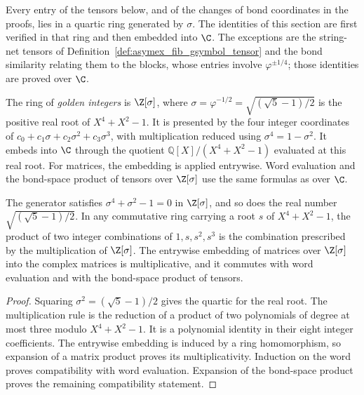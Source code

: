 Every entry of the tensors below, and of the changes of bond
coordinates in the proofs, lies in a quartic ring generated by
$\sigma$. The identities of this section are first verified in that
ring and then embedded into $\C$. The exceptions are the string-net
tensors of Definition~\ref{def:asymex_fib_gsymbol_tensor} and the bond
similarity relating them to the blocks, whose entries involve
$\varphi^{\pm1/4}$; those identities are proved over $\C$.

\begin{definition}
    \label{def:asymex_golden_ring}
    \leanok
    The ring of \emph{golden integers} is $\Z[\sigma]$, where
    $\sigma=\varphi^{-1/2}=\sqrt{(\sqrt5-1)/2}$ is the positive real
    root of $X^4+X^2-1$. It is presented by the four integer
    coordinates of $c_0+c_1\sigma+c_2\sigma^2+c_3\sigma^3$,
    with multiplication reduced using $\sigma^4=1-\sigma^2$.
    It embeds into $\C$ through the quotient
    $\mathbb{Q}[X]/(X^4+X^2-1)$ evaluated at this real root.
    For matrices, the embedding is applied entrywise.
    Word evaluation and the bond-space product of tensors over
    $\Z[\sigma]$ use the same formulas as over $\C$.
\end{definition}

\begin{lemma}
    \label{thm:asymex_golden_ring}
    \leanok
    The generator satisfies $\sigma^4+\sigma^2-1=0$ in $\Z[\sigma]$, and so
    does the real number $\sqrt{(\sqrt5-1)/2}$. In any commutative ring
    carrying a root $s$ of $X^4+X^2-1$, the product of two integer
    combinations of $1,s,s^2,s^3$ is the combination prescribed by the
    multiplication of $\Z[\sigma]$. The entrywise embedding of matrices
    over $\Z[\sigma]$ into the complex matrices is multiplicative, and it
    commutes with word evaluation and with the bond-space product of
    tensors.
\end{lemma}

\begin{proof}
    \leanok
    Squaring $\sigma^2=(\sqrt5-1)/2$ gives the quartic for the real root.
    The multiplication rule is the reduction of a product of two
    polynomials of degree at most three modulo $X^4+X^2-1$.
    It is a polynomial identity in their eight integer coefficients.
    The entrywise embedding is induced by a ring homomorphism, so
    expansion of a matrix product proves its multiplicativity.
    Induction on the word proves compatibility with word evaluation.
    Expansion of the bond-space product proves the remaining
    compatibility statement.
\end{proof}

